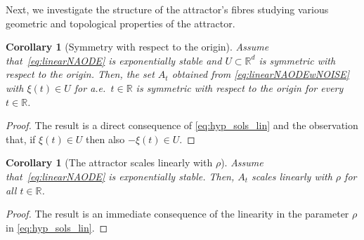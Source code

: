 \documentclass[reqno]{amsart}
\newtheorem{cor}[thm]{Corollary}
\theoremstyle{definition}
\numberwithin{equation}{section}
\newcommand{\R}{\mathbb{R}}
\newcommand{\A}{\mathcal{A}}
\newcommand{\U}{\mathcal{U}}
\newcommand{\ep}{\varepsilon}
\begin{document}

Next, we investigate the structure of the attractor's fibres studying various geometric and topological properties of the attractor. 

\begin{cor}[Symmetry with respect to the origin]\label{cor:symmetry}
     Assume that~\eqref{eq:linearNAODE} is exponentially stable and $U\subset\R^d$ is symmetric with respect to the origin. Then, the set $A_t$ obtained from \eqref{eq:linearNAODEwNOISE} with $\xi(t)\in U$ for a.e.~$t\in\R$ is symmetric with respect to the origin for every $t\in\R$.
\end{cor}
\begin{proof}
    The result is a direct consequence of \eqref{eq:hyp_sols_lin} and the observation that, if $\xi(t)\in U$ then also $-\xi(t)\in U$.
\end{proof}

\begin{cor}[The attractor scales linearly with $\rho$] \label{cor:scale}
     Assume that~\eqref{eq:linearNAODE} is exponentially stable. Then, $A_t$ scales linearly with $\rho$ for all $t\in\R$.
\end{cor}
\begin{proof}
    The result is an immediate consequence of the linearity in the parameter $\rho$ in \eqref{eq:hyp_sols_lin}.
\end{proof}
\end{document}
